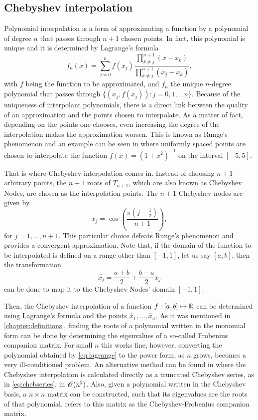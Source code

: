 \subsection{Chebyshev interpolation}
Polynomial interpolation is a form of approximating a function by a polynomial of degree $n$ that passes through $n+1$ chosen points. In fact, this polynomial is unique and it is determined by Lagrange's formula
\begin{equation}\label{eq:lagrange}
f_n(x) = \sum_{j=0}^{n} f(x_j)\dfrac{\prod_{k \neq j}^{n+1} (x-x_k)}{\prod_{k \neq j}^{n+1} (x_j-x_k)},
\end{equation}
with $f$ being the function to be approximated, and $f_n$ the unique $n$-degree polynomial that passes through $\{(x_j, f(x_j)): j=0, 1, \dots n\}$. Because of the uniqueness of interpolant polynomials, there is a direct link between the quality of an approximation and the points chosen to interpolate. As a matter of fact, depending on the points one chooses, even increasing the degree of the interpolation makes the approximation worsen. This is known as Runge's phenomenon and an example can be seen in  where uniformly spaced points are chosen to interpolate the function $f(x) = (1+x^2)^{-1}$ on the interval $[-5, 5]$. 

That is where Chebyshev interpolation comes in. Instead of choosing $n+1$ arbitrary points, the $n+1$ roots of $T_{n+1}$, which are also known as Chebyshev Nodes, are chosen as the interpolation points. The $n+1$ Chebyshev nodes are given by
\begin{equation}
x_j = \cos{\left(\dfrac{\pi(j-\frac{1}{2})}{n+1}\right)},
\end{equation}
for $j=1, \dots, n+1$. This particular choice defeats Runge's phenomenon and provides a convergent approximation. 
Note that, if the domain of the function to be interpolated is defined on a range other than $[-1, 1]$, let us say $[a, b]$, then the transformation
\begin{equation}
\hat{x_j} = \frac{a+b}{2} + \frac{b-a}{2}x_j
\end{equation}
can be done to map it to the Chebyshev Nodes' domain $[-1, 1]$.

Then, the Chebyshev interpolation of a function $f: [a, b] \mapsto \mathbb{R}$ can be determined using Lagrange's formula and the points $\hat{x}_1, \dots, \hat{x}_n$. 
As it was mentioned in \autoref{chapter:definitions}, finding the roots of a polynomial written in the monomial form can be done by determining the eigenvalues of a so-called Frobenius companion matrix. For small $n$ this works fine, however, converting the polynomial obtained by \autoref{eq:lagrange} to the power form, as $n$ grows, becomes a very ill-conditioned problem. 
An alternative method can be found in  where the Chebyshev interpolation is calculated directly as a truncated Chebyshev series, as in \autoref{eq:chebseries}, in $\mathscr{O}(n^2)$. Also, given a polynomial written in the Chebyshev basis, a $n\times n$ matrix can be constructed, such that its eigenvalues are the roots of that polynomial.  refers to this matrix as the Chebyshev-Frobenius companion matrix.

